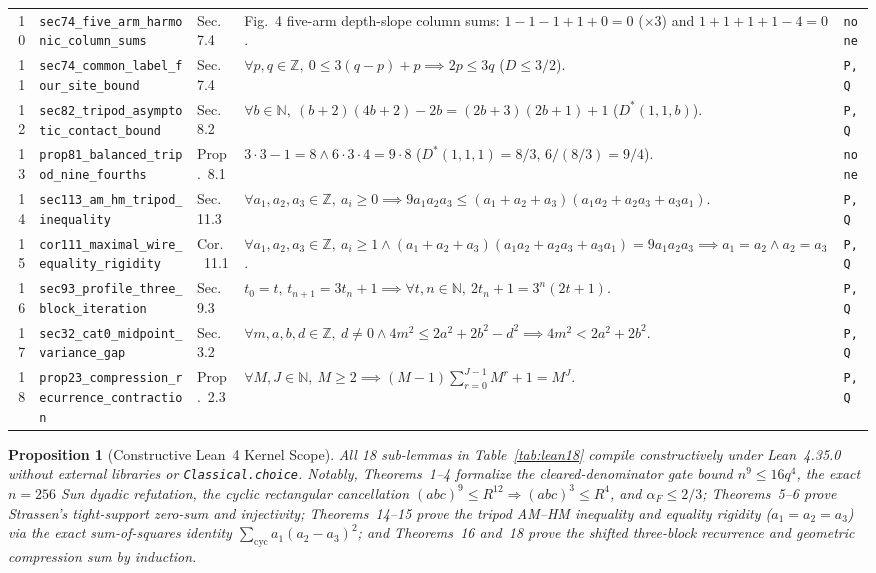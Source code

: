 \documentclass[10pt,twocolumn]{article}
\newtheorem{proposition}{Proposition}
\newcommand{\ZZ}{\mathbb{Z}}
\newcommand{\NN}{\mathbb{N}}
\begin{document}
\begin{table}[t]
\begin{tabular}{@{}r l l p{9.7cm} l@{}}
10 & \texttt{sec74\_five\_arm\_harmonic\_column\_sums} & Sec.~7.4 & Fig.~4 five-arm depth-slope column sums: $1{-}1{-}1{+}1{+}0=0$ ($\times 3$) and $1{+}1{+}1{+}1{-}4=0$. & \texttt{none} \\
11 & \texttt{sec74\_common\_label\_four\_site\_bound} & Sec.~7.4 & $\forall p,q\in\ZZ,\ 0\le 3(q-p)+p \implies 2p\le 3q$ ($D\le 3/2$). & \texttt{P,Q} \\
12 & \texttt{sec82\_tripod\_asymptotic\_contact\_bound} & Sec.~8.2 & $\forall b\in\NN,\ (b+2)(4b+2)-2b = (2b+3)(2b+1)+1$ ($D^*(1,1,b)$). & \texttt{P,Q} \\
13 & \texttt{prop81\_balanced\_tripod\_nine\_fourths} & Prop.~8.1 & $3\cdot 3 - 1 = 8 \wedge 6\cdot 3\cdot 4 = 9\cdot 8$ ($D^*(1,1,1)=8/3$, $6/(8/3)=9/4$). & \texttt{none} \\
14 & \texttt{sec113\_am\_hm\_tripod\_inequality} & Sec.~11.3 & $\forall a_1,a_2,a_3\in\ZZ,\ a_i\ge 0 \implies 9 a_1 a_2 a_3 \le (a_1{+}a_2{+}a_3)(a_1 a_2{+}a_2 a_3{+}a_3 a_1)$. & \texttt{P,Q} \\
15 & \texttt{cor111\_maximal\_wire\_equality\_rigidity} & Cor.~11.1 & $\forall a_1,a_2,a_3\in\ZZ,\ a_i\ge 1 \wedge (a_1{+}a_2{+}a_3)(a_1 a_2{+}a_2 a_3{+}a_3 a_1)=9a_1 a_2 a_3 \implies a_1{=}a_2\wedge a_2{=}a_3$. & \texttt{P,Q} \\
16 & \texttt{sec93\_profile\_three\_block\_iteration} & Sec.~9.3 & $t_0{=}t,\,t_{n+1}{=}3t_n{+}1 \implies \forall t,n\in\NN,\ 2 t_n + 1 = 3^n(2t + 1)$. & \texttt{P,Q} \\
17 & \texttt{sec32\_cat0\_midpoint\_variance\_gap} & Sec.~3.2 & $\forall m,a,b,d\in\ZZ,\ d\ne 0 \wedge 4m^2 \le 2a^2 + 2b^2 - d^2 \implies 4m^2 < 2a^2 + 2b^2$. & \texttt{P,Q} \\
18 & \texttt{prop23\_compression\_recurrence\_contraction} & Prop.~2.3 & $\forall M,J\in\NN,\ M\ge 2 \implies (M-1)\sum_{r=0}^{J-1} M^r + 1 = M^J$. & \texttt{P,Q} \\
\bottomrule
\end{tabular}
\end{table}

\begin{proposition}[Constructive Lean~4 Kernel Scope]\label{prop:lean}
\normalfont All 18 sub-lemmas in Table~\ref{tab:lean18} compile constructively under Lean~4.35.0 without external libraries or \texttt{Classical.choice}. Notably, Theorems~1--4 formalize the cleared-denominator gate bound $n^9\le 16q^4$, the exact $n=256$ Sun dyadic refutation, the cyclic rectangular cancellation $(abc)^9\le R^{12}\Rightarrow (abc)^3\le R^4$, and $\alpha_F\le 2/3$; Theorems~5--6 prove Strassen's tight-support zero-sum and injectivity; Theorems~14--15 prove the tripod AM--HM inequality and equality rigidity ($a_1=a_2=a_3$) via the exact sum-of-squares identity $\sum_{\mathrm{cyc}} a_1(a_2-a_3)^2$; and Theorems~16 and~18 prove the shifted three-block recurrence and geometric compression sum by induction.
\end{proposition}
\end{document}
